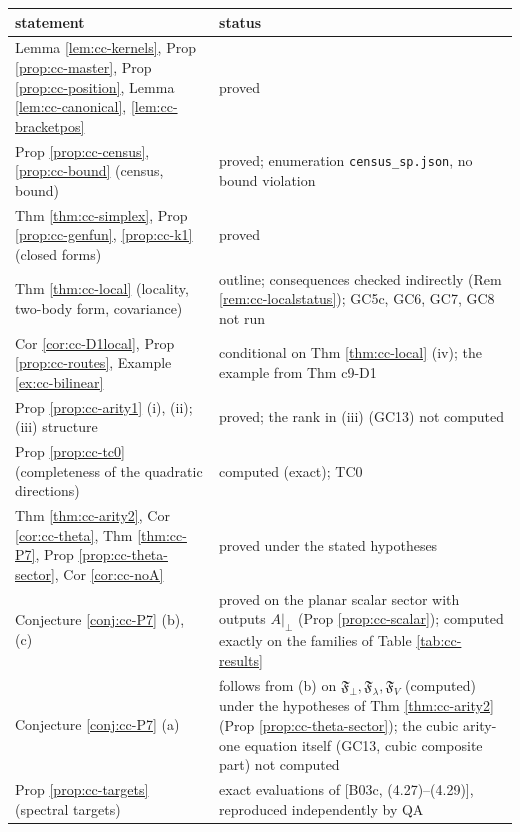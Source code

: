 \documentclass[11pt]{article}
\numberwithin{equation}{section}
\theoremstyle{plain}
\theoremstyle{definition}
\newcommand{\Ap}{A|_{\perp}}
\begin{document}
\begin{center}\small
\begin{tabular}{p{8.6cm}|p{7.4cm}}
statement & status\\\hline
Lemma \ref{lem:cc-kernels}, Prop \ref{prop:cc-master}, Prop \ref{prop:cc-position}, Lemma \ref{lem:cc-canonical}, \ref{lem:cc-bracketpos} & proved\\
Prop \ref{prop:cc-census}, \ref{prop:cc-bound} (census, bound) & proved; enumeration \texttt{census\_sp.json}, no bound violation\\
Thm \ref{thm:cc-simplex}, Prop \ref{prop:cc-genfun}, \ref{prop:cc-k1} (closed forms) & proved\\
Thm \ref{thm:cc-local} (locality, two-body form, covariance) & outline; consequences checked indirectly (Rem \ref{rem:cc-localstatus}); GC5c, GC6, GC7, GC8 not run\\
Cor \ref{cor:cc-D1local}, Prop \ref{prop:cc-routes}, Example \ref{ex:cc-bilinear} & conditional on Thm \ref{thm:cc-local} (iv); the example from Thm c9-D1\\
Prop \ref{prop:cc-arity1} (i), (ii); (iii) structure & proved; the rank in (iii) (GC13) not computed\\
Prop \ref{prop:cc-tc0} (completeness of the quadratic directions) & computed (exact); TC0\\
Thm \ref{thm:cc-arity2}, Cor \ref{cor:cc-theta}, Thm \ref{thm:cc-P7}, Prop \ref{prop:cc-theta-sector}, Cor \ref{cor:cc-noA} & proved under the stated hypotheses\\
Conjecture \ref{conj:cc-P7} (b), (c) & proved on the planar scalar sector with outputs $\Ap$ (Prop \ref{prop:cc-scalar}); computed exactly on the families of Table \ref{tab:cc-results}\\
Conjecture \ref{conj:cc-P7} (a) & follows from (b) on $\mathfrak F_\perp,\mathfrak F_\lambda,\mathfrak F_V$ (computed) under the hypotheses of Thm \ref{thm:cc-arity2} (Prop \ref{prop:cc-theta-sector}); the cubic arity-one equation itself (GC13, cubic composite part) not computed\\
Prop \ref{prop:cc-targets} (spectral targets) & exact evaluations of [B03c, (4.27)--(4.29)], reproduced independently by QA\\
\end{tabular}
\end{center}
\end{document}
